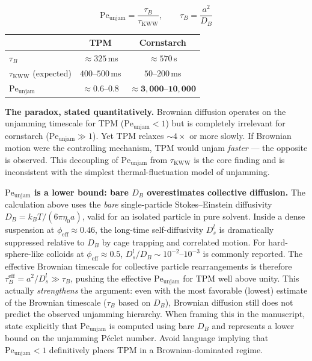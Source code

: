 \documentclass[11pt,letterpaper]{article}
\newcommand{\phieff}{\phi_{\mathrm{eff}}}
\newcommand{\taukww}{\tau_{\mathrm{KWW}}}
\newcommand{\taub}{\tau_{B}}
\newcommand{\peunj}{\mathrm{Pe}_{\mathrm{unjam}}}
\newcommand{\DB}{D_B}
\begin{document}
\begin{equation}
  \peunj = \frac{\taub}{\taukww}, \qquad
  \taub = \frac{a^2}{\DB}
  \label{eq:Pe_unjam}
\end{equation}

\begin{center}
\begin{tabular}{lcc}
  \toprule
  & TPM & Cornstarch \\
  \midrule
  $\taub$ & ${\approx}325$\,ms & ${\approx}570$\,s \\
  $\taukww$ (expected) & $400$--$500$\,ms & $50$--$200$\,ms \\
  $\peunj$ & $\mathbf{{\approx}0.6}$--$\mathbf{0.8}$ & $\mathbf{{\approx}3{,}000}$--$\mathbf{10{,}000}$ \\
  \bottomrule
\end{tabular}
\end{center}

\begin{intuitionbox}
\textbf{The paradox, stated quantitatively.}
Brownian diffusion operates on the unjamming timescale for TPM
($\peunj < 1$) but is completely irrelevant for cornstarch ($\peunj \gg 1$).
Yet TPM relaxes ${\sim}4\times$ or more slowly. If Brownian motion were
the controlling mechanism, TPM would unjam \emph{faster} --- the opposite
is observed. This decoupling of $\peunj$ from $\taukww$ is the core finding
and is inconsistent with the simplest thermal-fluctuation model of unjamming.
\end{intuitionbox}

\begin{cautionbox}
\textbf{$\peunj$ is a lower bound: bare $\DB$ overestimates collective diffusion.}
The calculation above uses the \emph{bare} single-particle Stokes--Einstein diffusivity
$\DB = k_BT/(6\pi\eta_0 a)$, valid for an isolated particle in pure solvent. Inside a
dense suspension at $\phieff \approx 0.46$, the long-time self-diffusivity $D_s^l$ is
dramatically suppressed relative to $\DB$ by cage trapping and correlated motion. For
hard-sphere-like colloids at $\phieff \approx 0.5$, $D_s^l/\DB \sim 10^{-2}$--$10^{-3}$
is commonly reported. The effective Brownian timescale for collective particle rearrangements
is therefore $\tau_B^\mathrm{eff} = a^2/D_s^l \gg \taub$, pushing the effective $\peunj$ for
TPM well above unity. This actually \emph{strengthens} the argument: even with the most
favorable (lowest) estimate of the Brownian timescale ($\taub$ based on $\DB$), Brownian
diffusion still does not predict the observed unjamming hierarchy. When framing this in the
manuscript, state explicitly that $\peunj$ is computed using bare $\DB$ and represents a
lower bound on the unjamming P\'{e}clet number. Avoid language implying that $\peunj < 1$
definitively places TPM in a Brownian-dominated regime.
\end{cautionbox}
\end{document}
